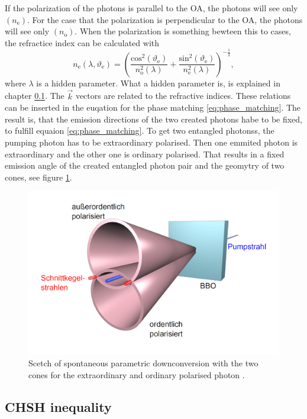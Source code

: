 If the polarization of the photons is parallel to the OA, the photons will see only $(n_{\mathrm{e}})$. 
For the case that the polarization is perpendicular to the OA, the photons will see only $(n_{\mathrm{o}})$. When the polarization is something bewteen this to cases, the refractice index can be calculated with
\begin{equation}
    n_{\mathrm{e}}(\lambda, \vartheta_{\mathrm{e}}) 
    = \left( 
    \frac{\mathrm{cos}^2(\vartheta_{\mathrm{e}})}{n_{\mathrm{o}}^2(\lambda)} 
    + \frac{\mathrm{sin}^2(\vartheta_{\mathrm{e}})}{n_{\mathrm{e}}^2(\lambda)}
    \right)^{-\frac{1}{2}},
\end{equation}
where $\lambda$ is a hidden parameter. What a hidden parameter is, is explained in chapter \ref{sec:theory_CHSH}.  
The $\vec{k}$ vectors are related to the refractive indices. These relations can be inserted in the euqation for the phase matching \eqref{eq:phase_matching}. The result is, that the emission directions of the two created photons habe to be fixed, to fulfill equaion \eqref{eq:phase_matching}. To get two entangled photonss, the pumping photon has to be extraordinary polarised. Then one emmited photon is extraordinary and the other one is ordinary polarised. That results in a fixed emission angle of the created entangled photon pair and the geomytry of two cones, see figure \ref{fig:theory_cones}. 
\begin{figure}[H]
\centering
\includegraphics[scale=0.2]{figures/2_kegel.PNG}
\caption{Scetch of spontaneous parametric downconversion with the two cones for the extraordinary and ordinary polarised photon \cite{barz}.   }
\label{fig:theory_cones}
\end{figure}

\subsection{CHSH inequality}\label{sec:theory_CHSH}

